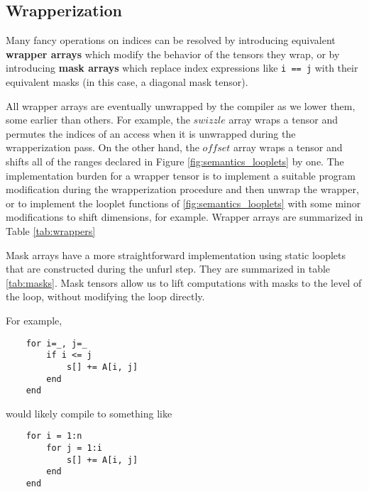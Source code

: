 \subsection{Wrapperization}

    Many fancy operations on indices can be resolved by introducing equivalent
    \textbf{wrapper arrays} which modify the behavior of the tensors they wrap,
    or by introducing \textbf{mask arrays} which replace index expressions like
    \texttt{i == j} with their equivalent masks (in this case, a
    diagonal mask tensor).

    All wrapper arrays are eventually unwrapped by the compiler as we lower
    them, some earlier than others. For example, the $swizzle$ array wraps a
    tensor and permutes the indices of an access when it is unwrapped during the
    wrapperization pass. On the other hand, the $offset$ array wraps a tensor
    and shifts all of the ranges declared in Figure \ref{fig:semantics_looplets} by one.
    The implementation burden for a wrapper tensor is to implement a suitable
    program modification during the wrapperization procedure and then unwrap the wrapper, or to 
    implement the looplet functions of \ref{fig:semantics_looplets} with some minor modifications
    to shift dimensions, for example. Wrapper arrays are summarized in Table \ref{tab:wrappers}

    Mask arrays have a more straightforward implementation using static looplets
    that are constructed during the unfurl step. They are summarized in table \ref{tab:masks}. Mask tensors
    allow us to lift computations with masks to the level of the loop, without modifying the loop directly.

    For example, \begin{verbatim}
    for i=_, j=_
        if i <= j
            s[] += A[i, j]
        end
    end
    \end{verbatim}

    would likely compile to something like

    \begin{verbatim}
    for i = 1:n
        for j = 1:i
            s[] += A[i, j]
        end
    end
    \end{verbatim}

